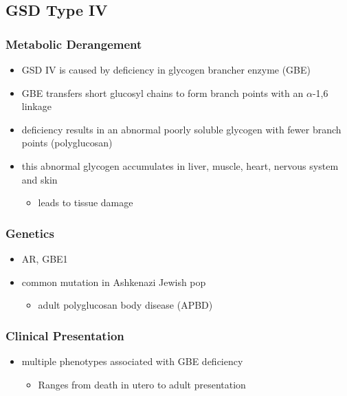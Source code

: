 \documentclass{scrartcl}
\begin{document}
\subsection{GSD Type IV}
\label{sec:orge421cd8}
\subsubsection{Metabolic Derangement}
\label{sec:org98c842a}
\begin{itemize}
\item GSD IV is caused by deficiency in glycogen brancher enzyme (GBE)
\item GBE transfers short glucosyl chains to form branch points with an
\(\alpha\)-1,6 linkage
\item deficiency results in an abnormal poorly soluble glycogen with fewer branch points (polyglucosan)
\item this abnormal glycogen accumulates in liver, muscle, heart, nervous system and skin
\begin{itemize}
\item leads to tissue damage
\end{itemize}
\end{itemize}

\subsubsection{Genetics}
\label{sec:org2f2e6a8}
\begin{itemize}
\item AR, GBE1
\item common mutation in Ashkenazi Jewish pop
\begin{itemize}
\item adult polyglucosan body disease (APBD)
\end{itemize}
\end{itemize}

\subsubsection{Clinical Presentation}
\label{sec:org16de578}

\begin{itemize}
\item multiple phenotypes associated with GBE deficiency
\begin{itemize}
\item Ranges from death in utero to adult presentation
\end{itemize}
\end{itemize}
\end{document}
